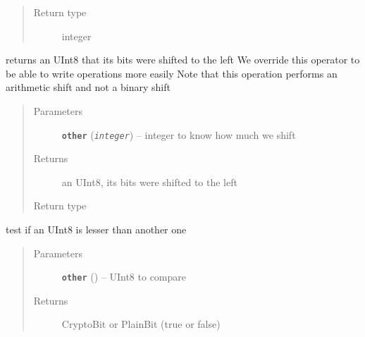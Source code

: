 \documentclass[letterpaper,10pt,english]{sphinxmanual}
\begin{document}
\begin{fulllineitems}
\begin{fulllineitems}
\begin{quote}
\begin{description}
\item[{Return type}] \leavevmode
integer

\end{description}\end{quote}

\end{fulllineitems}


\begin{fulllineitems}
\label{datatypes.integers:datatypes.integers.UInt8.UInt8.__lshift__}
returns an UInt8 that its bits were shifted to the left
We override this operator to be able to write operations more easily
Note that this operation performs an arithmetic shift and not a binary shift
\begin{quote}\begin{description}
\item[{Parameters}] \leavevmode
\textbf{\texttt{other}} (\emph{\texttt{integer}}) -- integer to know how much we shift

\item[{Returns}] \leavevmode
an UInt8, its bits were shifted to the left

\item[{Return type}] \leavevmode
{\hyperref[datatypes.integers:datatypes.integers.UInt8.UInt8]{}}

\end{description}\end{quote}

\end{fulllineitems}


\begin{fulllineitems}
\label{datatypes.integers:datatypes.integers.UInt8.UInt8.__lt__}
test if an UInt8 is lesser than another one
\begin{quote}\begin{description}
\item[{Parameters}] \leavevmode
\textbf{\texttt{other}} ({\hyperref[datatypes.integers:datatypes.integers.UInt8.UInt8]{}}) -- UInt8 to compare

\item[{Returns}] \leavevmode
CryptoBit or PlainBit (true or false)


\end{description}
\end{quote}
\end{fulllineitems}
\end{fulllineitems}
\end{document}
